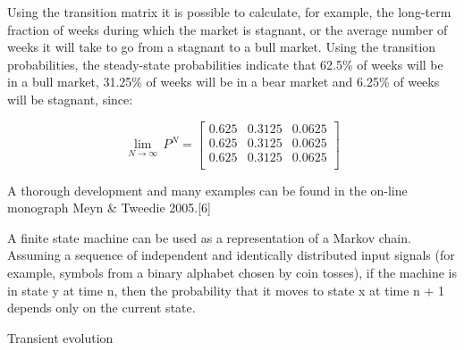 Using the transition matrix it is possible to calculate, for example, the long-term fraction of weeks during which the market is stagnant, or the average number of weeks it will take to go from a stagnant to a bull market. Using the transition probabilities, the steady-state probabilities indicate that 62.5\% of weeks will be in a bull market, 31.25\% of weeks will be in a bear market and 6.25\% of weeks will be stagnant, since:

\[\lim_{N\to \infty } \, P^N=
\begin{bmatrix}
 0.625 & 0.3125 & 0.0625 \\
 0.625 & 0.3125 & 0.0625 \\
 0.625 & 0.3125 & 0.0625 \\
\end{bmatrix}\]

A thorough development and many examples can be found in the on-line monograph Meyn & Tweedie 2005.[6]

A finite state machine can be used as a representation of a Markov chain. Assuming a sequence of independent and identically distributed input signals (for example, symbols from a binary alphabet chosen by coin tosses), if the machine is in state y at time n, then the probability that it moves to state x at time n + 1 depends only on the current state.

Transient evolution
